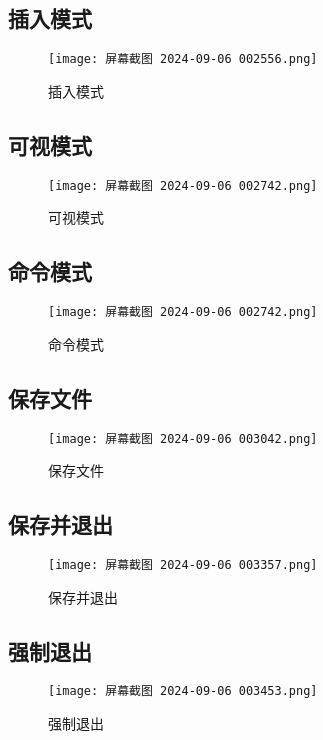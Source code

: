 \documentclass[a4paper, 12pt]{article}
\begin{document}
\subsection{插入模式}
\begin{figure}[H]
    \centering
    \texttt{[image: 屏幕截图 2024-09-06 002556.png]}
    \caption{插入模式}
    \label{fig:insert_mode}
\end{figure}

\subsection{可视模式}
\begin{figure}[H]
    \centering
    \texttt{[image: 屏幕截图 2024-09-06 002742.png]}
    \caption{可视模式}
    \label{fig:visual_mode}
\end{figure}

\subsection{命令模式}
\begin{figure}[H]
    \centering
    \texttt{[image: 屏幕截图 2024-09-06 002742.png]}
    \caption{命令模式}
    \label{fig:command_mode}
\end{figure}

\subsection{保存文件}
\begin{figure}[H]
    \centering
    \texttt{[image: 屏幕截图 2024-09-06 003042.png]}
    \caption{保存文件}
    \label{fig:save_file}
\end{figure}

\subsection{保存并退出}
\begin{figure}[H]
    \centering
    \texttt{[image: 屏幕截图 2024-09-06 003357.png]}
    \caption{保存并退出}
    \label{fig:save_and_exit}
\end{figure}

\subsection{强制退出}
\begin{figure}[H]
    \centering
    \texttt{[image: 屏幕截图 2024-09-06 003453.png]}
    \caption{强制退出}
    \label{fig:force_exit}
\end{figure}
\end{document}
